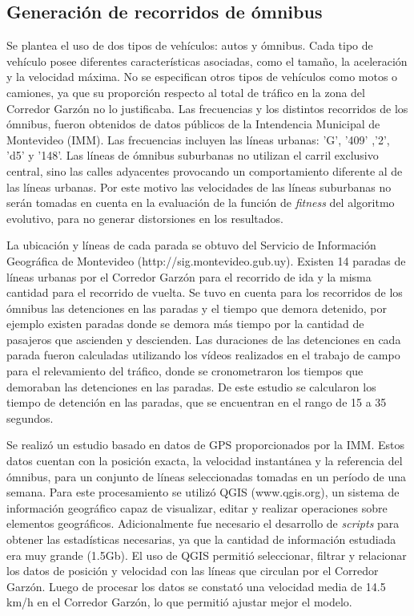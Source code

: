 \subsection{Generación de recorridos de ómnibus}

Se plantea el uso de dos tipos de vehículos: autos y ómnibus. Cada tipo de vehículo posee diferentes características asociadas, como el tamaño, la aceleración y la velocidad máxima. No se especifican otros tipos de vehículos como motos o camiones, ya que su proporción respecto al total de tráfico en la zona del Corredor Garzón no lo justificaba. Las frecuencias y los distintos recorridos de los ómnibus, fueron obtenidos de datos públicos de la Intendencia Municipal de Montevideo (IMM). Las frecuencias incluyen las líneas urbanas: 'G', '409' ,'2', 'd5'  y  '148'. Las líneas de ómnibus suburbanas no utilizan el carril exclusivo central, sino las calles adyacentes provocando un comportamiento diferente al de las líneas urbanas. Por este motivo las velocidades de las líneas suburbanas no serán tomadas en cuenta en la evaluación de la función de \emph{fitness} del algoritmo evolutivo, para no generar distorsiones en los resultados.

La ubicación y líneas de cada parada se obtuvo del Servicio de Información Geográfica de Montevideo (http://sig.montevideo.gub.uy). Existen 14 paradas de líneas urbanas por el Corredor Garzón para el recorrido de ida y la misma cantidad para el recorrido de vuelta. Se tuvo en cuenta para los recorridos de los ómnibus las detenciones en las paradas y el tiempo que demora detenido, por ejemplo existen paradas donde se demora más tiempo por la cantidad de pasajeros que ascienden y descienden. Las duraciones de las detenciones en cada parada fueron calculadas utilizando los vídeos realizados en el trabajo de campo para el relevamiento del tráfico, donde se cronometraron los tiempos que demoraban las detenciones en las paradas. De este estudio se calcularon los tiempo de detención en las paradas, que se encuentran en el rango de 15 a 35 segundos.

Se realizó un estudio basado en datos de GPS proporcionados por la IMM. Estos datos cuentan con la posición exacta, la velocidad instantánea y la referencia del ómnibus, para un conjunto de líneas seleccionadas tomadas en un período de una semana. 
Para este procesamiento se utilizó QGIS (www.qgis.org), un sistema de información geográfico capaz de visualizar, editar y realizar operaciones sobre elementos geográficos. Adicionalmente fue necesario el desarrollo de \emph{scripts} para obtener las estadísticas necesarias, ya que la cantidad de información estudiada era muy grande (1.5Gb). El uso de QGIS permitió seleccionar, filtrar y relacionar los datos de posición y velocidad con las líneas que circulan por el Corredor Garzón. Luego de procesar los datos se constató una velocidad media de 14.5 km/h en el Corredor Garzón, lo que permitió ajustar mejor el modelo. 


